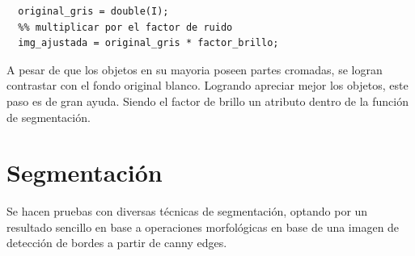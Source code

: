 \documentclass[a4paper, 11pt]{article}
\begin{document}
\begin{lstlisting}[style=Matlab-editor, caption=Factor de brillo]
  %% pasar a double
  original_gris = double(I);
  %% multiplicar por el factor de ruido
  img_ajustada = original_gris * factor_brillo;
\end{lstlisting}

A pesar de que los objetos en su mayoria poseen partes cromadas, se logran contrastar con el fondo original blanco. Logrando apreciar mejor los objetos, este paso es de gran ayuda. Siendo el factor de brillo un atributo dentro de la función de segmentación.




\pagebreak
\section{Segmentación}

Se hacen pruebas con diversas técnicas de segmentación, optando por un resultado sencillo en base a operaciones morfológicas en base de una imagen de detección de bordes a partir de canny edges.\\
\end{document}
